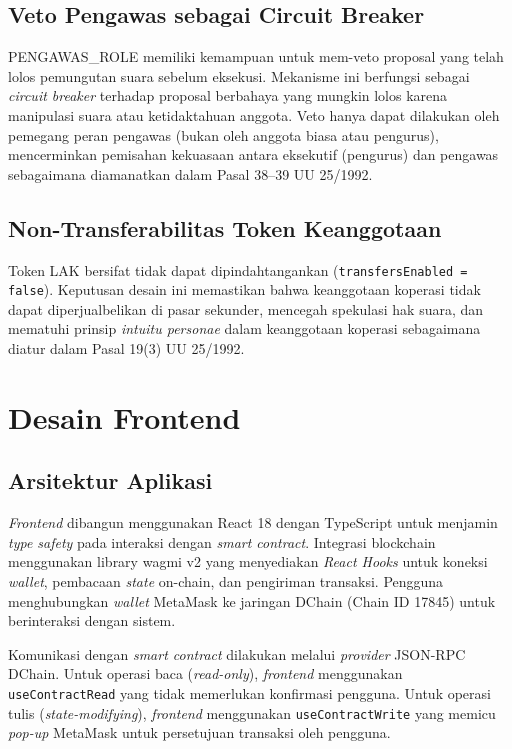 \subsection{Veto Pengawas sebagai Circuit Breaker}

PENGAWAS\_ROLE memiliki kemampuan untuk mem-veto proposal yang telah lolos pemungutan suara sebelum eksekusi. Mekanisme ini berfungsi sebagai \textit{circuit breaker} terhadap proposal berbahaya yang mungkin lolos karena manipulasi suara atau ketidaktahuan anggota. Veto hanya dapat dilakukan oleh pemegang peran pengawas (bukan oleh anggota biasa atau pengurus), mencerminkan pemisahan kekuasaan antara eksekutif (pengurus) dan pengawas sebagaimana diamanatkan dalam Pasal 38--39 UU 25/1992.

\subsection{Non-Transferabilitas Token Keanggotaan}

Token LAK bersifat tidak dapat dipindahtangankan (\texttt{transfersEnabled = false}). Keputusan desain ini memastikan bahwa keanggotaan koperasi tidak dapat diperjualbelikan di pasar sekunder, mencegah spekulasi hak suara, dan mematuhi prinsip \textit{intuitu personae} dalam keanggotaan koperasi sebagaimana diatur dalam Pasal 19(3) UU 25/1992.

\section{Desain Frontend}

\subsection{Arsitektur Aplikasi}

\textit{Frontend} dibangun menggunakan React 18 dengan TypeScript untuk menjamin \textit{type safety} pada interaksi dengan \textit{smart contract}. Integrasi blockchain menggunakan library wagmi v2 yang menyediakan \textit{React Hooks} untuk koneksi \textit{wallet}, pembacaan \textit{state} on-chain, dan pengiriman transaksi. Pengguna menghubungkan \textit{wallet} MetaMask ke jaringan DChain (Chain ID 17845) untuk berinteraksi dengan sistem.

Komunikasi dengan \textit{smart contract} dilakukan melalui \textit{provider} JSON-RPC DChain. Untuk operasi baca (\textit{read-only}), \textit{frontend} menggunakan \texttt{useContractRead} yang tidak memerlukan konfirmasi pengguna. Untuk operasi tulis (\textit{state-modifying}), \textit{frontend} menggunakan \texttt{useContractWrite} yang memicu \textit{pop-up} MetaMask untuk persetujuan transaksi oleh pengguna.

